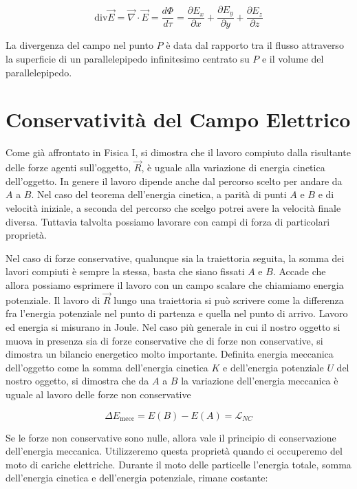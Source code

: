 \[
	\boxed{\text{div}\vec{E} = \vec{\nabla} \cdot \vec{E} = \frac{d\Phi}{d\tau} = \frac{\partial E_x}{\partial x} + \frac{\partial E_y}{\partial y} + \frac{\partial E_z}{\partial z}}
\]

La divergenza del campo nel punto $P$ è data dal rapporto tra il flusso attraverso la superficie di un parallelepipedo infinitesimo centrato su $P$ e il volume del parallelepipedo.

\section{Conservatività del Campo Elettrico}

Come già affrontato in Fisica I, si dimostra che il lavoro compiuto dalla risultante delle forze agenti sull'oggetto, $\vec{R}$, è uguale alla variazione di energia cinetica dell'oggetto. In genere il lavoro dipende anche dal percorso scelto per andare da $A$ a $B$. Nel caso del teorema dell'energia cinetica, a parità di punti $A$ e $B$ e di velocità iniziale, a seconda del percorso che scelgo potrei avere la velocità finale diversa. Tuttavia talvolta possiamo lavorare con campi di forza di particolari proprietà.

Nel caso di forze conservative, qualunque sia la traiettoria seguita, la somma dei lavori compiuti è sempre la stessa, basta che siano fissati $A$ e $B$. Accade che allora possiamo esprimere il lavoro con un campo scalare che chiamiamo energia potenziale. Il lavoro di $\vec{R}$ lungo una traiettoria si può scrivere come la differenza fra l'energia potenziale nel punto di partenza e quella nel punto di arrivo. Lavoro ed energia si misurano in Joule.
Nel caso più generale in cui il nostro oggetto si muova in presenza sia di forze conservative che di forze non conservative, si dimostra un bilancio energetico molto importante. Definita energia meccanica dell'oggetto come la somma dell'energia cinetica $K$ e dell'energia potenziale $U$ del nostro oggetto, si dimostra che da $A$ a $B$ la variazione dell'energia meccanica è uguale al lavoro delle forze non conservative

\[
	\Delta E_{\text{mecc}} = E(B) - E(A) = \mathcal{L}_{NC}
\]

Se le forze non conservative sono nulle, allora vale il principio di conservazione dell'energia meccanica. Utilizzeremo questa proprietà quando ci occuperemo del moto di cariche elettriche.
Durante il moto delle particelle l'energia totale, somma dell'energia cinetica e dell'energia potenziale, rimane costante:

